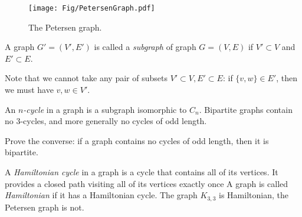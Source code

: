 \begin{page}
\setcounter{section}{1}
\setcounter{subsection}{3}
\setcounter{dfn}{6}
\label{portion:193}


\begin{figure}[h]
\begin{center}
\texttt{[image: Fig/PetersenGraph.pdf]}
\end{center}
\caption{The Petersen graph.}
\label{fig:Petersen}
\end{figure}


\end{page}

\begin{page}
\setcounter{section}{1}
\setcounter{subsection}{3}
\setcounter{dfn}{7}
\label{portion:195}

\begin{dfn}
A graph $G' = (V', E')$ is called a \emph{subgraph} of graph $G = (V, E)$ if $V' \subset V$ and $E' \subset E$.
\end{dfn}

\end{page}

\begin{page}
\setcounter{section}{1}
\setcounter{subsection}{3}
\setcounter{dfn}{7}
\label{portion:196}

Note that we cannot take any pair of subsets $V' \subset V, E' \subset E$:
if $\{v, w\} \in E'$, then we must have $v, w \in V'$.

An \emph{$n$-cycle} in a graph is a subgraph isomorphic to $C_n$.
Bipartite graphs contain no $3$-cycles, and more generally no cycles of odd length.


\end{page}

\begin{page}
\setcounter{section}{1}
\setcounter{subsection}{3}
\setcounter{dfn}{8}
\label{portion:198}

\begin{exc}
Prove the converse: if a graph contains no cycles of odd length, then it is bipartite.
\end{exc}

\end{page}

\begin{page}
\setcounter{section}{1}
\setcounter{subsection}{4}
\setcounter{dfn}{8}
\label{portion:199}


A \emph{Hamiltonian cycle} in a graph is a cycle that contains all of its vertices.
It provides a closed path visiting all of its vertices exactly once
A graph is called \emph{Hamiltonian} if it has a Hamiltonian cycle.
The graph $K_{3,3}$ is Hamiltonian, the Petersen graph is not.




\end{page}

